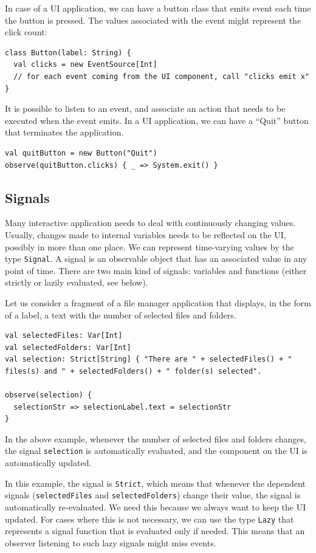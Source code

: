In case of a UI application, we can have a button class that emits event each time the button is pressed. The values associated with the event might represent the click count:

\begin{lstlisting}
class Button(label: String) {
  val clicks = new EventSource[Int]
  // for each event coming from the UI component, call "clicks emit x"
}
\end{lstlisting}

It is possible to listen to an event, and associate an action that needs to be executed when the event emits. In a UI application, we can have a ``Quit'' button that terminates the application.
\begin{lstlisting}
val quitButton = new Button("Quit")
observe(quitButton.clicks) { _ => System.exit() }
\end{lstlisting}

\subsection{Signals}

Many interactive application needs to deal with continuously changing values. Usually, changes made to internal variables needs to be reflected on the UI, possibly in more than one place. We can represent time-varying values by the type \texttt{Signal}. A signal is an observable object that has an associated value in any point of time. There are two main kind of signals: variables and functions (either strictly or lazily evaluated, see below).

Let us consider a fragment of a file manager application that displays, in the form of a label, a text with the number of selected files and folders.

\begin{lstlisting}
val selectedFiles: Var[Int]
val selectedFolders: Var[Int]
val selection: Strict[String] { "There are " + selectedFiles() + " files(s) and " + selectedFolders() + " folder(s) selected".

observe(selection) {
  selectionStr => selectionLabel.text = selectionStr
}
\end{lstlisting}

In the above example, whenever the number of selected files and folders changes, the signal \texttt{selection} is automatically evaluated, and the component on the UI is automatically updated. 

In this example, the signal is \texttt{Strict}, which means that whenever the dependent signals (\texttt{selectedFiles} and \texttt{selectedFolders}) change their value, the signal is automatically re-evaluated. We need this because we always want to keep the UI updated. For cases where this is not necessary, we can use the type \texttt{Lazy} that represents a signal function that is evaluated only if needed. This means that an observer listening to such lazy signals might miss events.

